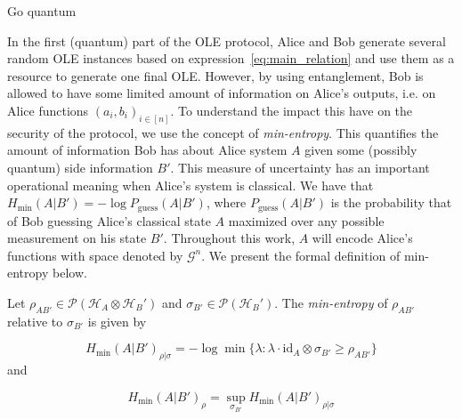 {\cv Go quantum}

In the first (quantum) part of the OLE protocol, Alice and Bob generate several random OLE instances based on expression~\eqref{eq:main_relation} and use them as a resource to generate one final OLE. However, by using entanglement, Bob is allowed to have some limited amount of information on Alice's outputs, i.e. on Alice functions $(a_i, b_i)_{i\in [n]}$. To understand the impact this have on the security of the protocol, we use the concept of \textit{min-entropy}. This quantifies the amount of information Bob has about Alice system $A$ given some (possibly quantum) side information $B'$. This measure of uncertainty has an important operational meaning when Alice's system is classical. We have that $H_{\text{min}}(A|B') = - \log P_{\text{guess}}(A|B')$, where $P_{\text{guess}}(A|B')$ is the probability that of Bob guessing Alice's classical state $A$ maximized over any possible measurement on his state $B'$. Throughout this work, $A$ will encode Alice's functions with space denoted by $\mathcal{G}^n$. We present the formal definition of min-entropy below.

\begin{definition}
Let $\rho_{A B'} \in \mathcal{P}(\mathcal{H}_A \otimes \mathcal{H}_B')$ and $\sigma_{B'} \in \mathcal{P}(\mathcal{H}_B')$. The \textit{min-entropy} of $\rho_{A B'}$ relative to $\sigma_{B'}$ is given by

$$H_{\text{min}}(A | B')_{\rho|\sigma} = -\log \min\{ \lambda : \lambda \cdot \text{id}_A \otimes \sigma_{B'} \geq \rho_{A B'} \}$$
and 

$$ H_{\text{min}}(A | B')_{\rho} = \sup_{\sigma_{B'}} H_{\text{min}}(A | B')_{\rho|\sigma} $$
\end{definition}





